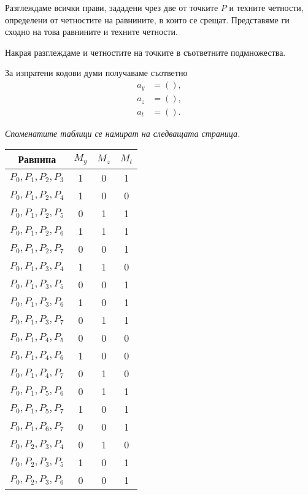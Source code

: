 \documentclass[11pt, oneside]{article}   	%
\begin{document}
Разглеждаме всички прави, зададени чрез две от точките $P$ и техните четности, определени от четностите на равнините, в които се срещат. Представяме ги сходно на това равнините и техните четности.

Накрая разглеждаме и четностите на точките в съответните подмножества.

За изпратени кодови думи получаваме съответно
\begin{align*}
a_{y} &= (), \\
a_{z} &= (), \\
a_{t} &= ().
\end{align*}

\textit{Споменатите таблици се намират на следващата страница.}

\begin{table}
\begin{minipage}[t]{.3\textwidth}
\begin{tabular}{cccc}
\toprule
\textbf{Равнина} & \textbf{$M_{y}$} & \textbf{$M_{z}$} & \textbf{$M_{t}$}\\
\midrule
$ P_{0}, P_{1}, P_{2}, P_{3} $ & 1 & 0 & 1 \\
$ P_{0}, P_{1}, P_{2}, P_{4} $ & 1 & 0 & 0 \\
$ P_{0}, P_{1}, P_{2}, P_{5} $ & 0 & 1 & 1 \\
$ P_{0}, P_{1}, P_{2}, P_{6} $ & 1 & 1 & 1 \\
$ P_{0}, P_{1}, P_{2}, P_{7} $ & 0 & 0 & 1 \\
$ P_{0}, P_{1}, P_{3}, P_{4} $ & 1 & 1 & 0 \\
$ P_{0}, P_{1}, P_{3}, P_{5} $ & 0 & 0 & 1 \\
$ P_{0}, P_{1}, P_{3}, P_{6} $ & 1 & 0 & 1 \\
$ P_{0}, P_{1}, P_{3}, P_{7} $ & 0 & 1 & 1 \\
$ P_{0}, P_{1}, P_{4}, P_{5} $ & 0 & 0 & 0 \\
$ P_{0}, P_{1}, P_{4}, P_{6} $ & 1 & 0 & 0 \\
$ P_{0}, P_{1}, P_{4}, P_{7} $ & 0 & 1 & 0 \\
$ P_{0}, P_{1}, P_{5}, P_{6} $ & 0 & 1 & 1 \\
$ P_{0}, P_{1}, P_{5}, P_{7} $ & 1 & 0 & 1 \\
$ P_{0}, P_{1}, P_{6}, P_{7} $ & 0 & 0 & 1 \\
$ P_{0}, P_{2}, P_{3}, P_{4} $ & 0 & 1 & 0 \\
$ P_{0}, P_{2}, P_{3}, P_{5} $ & 1 & 0 & 1 \\
$ P_{0}, P_{2}, P_{3}, P_{6} $ & 0 & 0 & 1 \\

\end{tabular}
\end{minipage}
\end{table}
\end{document}
